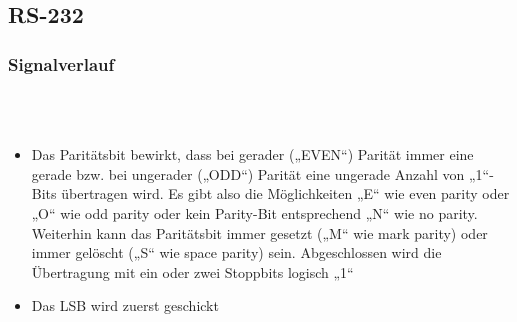 \subsection{RS-232}
\subsubsection{Signalverlauf}
	\\
	\\
  \begin{itemize}
    \item Das Paritätsbit bewirkt, dass bei gerader („EVEN“) Parität immer eine
    gerade bzw. bei ungerader („ODD“) Parität eine ungerade Anzahl von „1“-Bits übertragen wird. Es gibt also die Möglichkeiten „E“ wie even parity oder „O“ wie odd parity oder kein Parity-Bit entsprechend „N“ wie no parity. Weiterhin kann das Paritätsbit immer gesetzt („M“ wie mark parity) oder immer gelöscht („S“ wie space parity) sein. Abgeschlossen wird die Übertragung mit ein oder zwei Stoppbits logisch „1“
    \item Das LSB wird zuerst geschickt
  \end{itemize}

